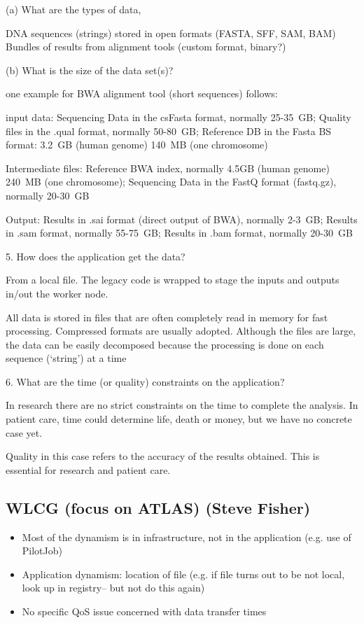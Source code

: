 \documentclass[preprint,12pt]{article}
\begin{document}
(a) What are the types of data,

DNA sequences (strings) stored in open formats (FASTA, SFF, SAM, BAM)
Bundles of results from alignment tools (custom format, binary?)

(b) What is the size of the data set(s)?

one example for BWA alignment tool (short sequences) follows:

input data: Sequencing Data in the csFasta format, normally 25-35~GB;
Quality files in the .qual format, normally 50-80~GB;
Reference DB in the Fasta BS format: 3.2~GB (human genome) 140~MB (one chromosome)

Intermediate files:
Reference BWA index, normally 4.5GB (human genome) 240~MB (one chromosome);
Sequencing Data in the FastQ format (fastq.gz), normally 20-30~GB

Output:
Results in .sai format (direct output of BWA), normally 2-3~GB;
Results in .sam format, normally 55-75~GB;
Results in .bam format, normally 20-30~GB

5. How does the application get the data?

From a local file. The legacy code is wrapped to stage the inputs and outputs in/out the worker node.

All data is stored in files that are often completely read in memory for fast processing. Compressed formats are usually adopted. Although the files are large, the data can be easily decomposed because the processing is done on each sequence (`string') at a time

6. What are the time (or quality) constraints on the application?

In research there are no strict constraints on the time to complete the analysis.
In patient care, time could determine life, death or money, but we have no concrete case yet.

Quality in this case refers to the accuracy of the results obtained. This is essential for research and patient care.




\subsection{WLCG (focus on ATLAS) (Steve Fisher) \label{WLCGSteve}}
\begin{itemize}
\item Most of the dynamism is in infrastructure, not in the application (e.g. use of PilotJob)
\item Application dynamism: location of file (e.g. if file turns out to be not local, look up in registry-- but not do this again)
\item No specific QoS issue concerned with data transfer times
\end{itemize}
\end{document}
